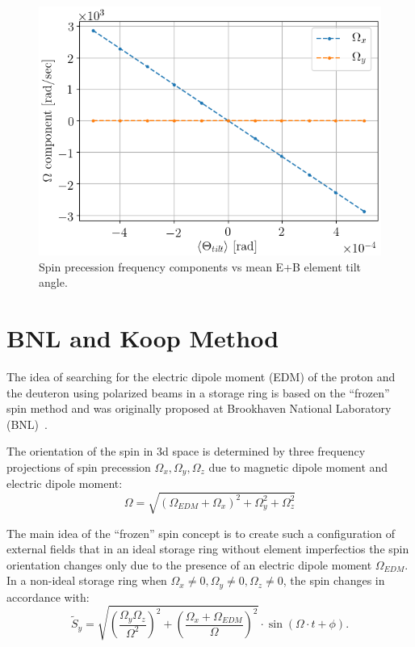 \documentclass[a4paper]{jpconf}
\newcommand{\W}{\Omega}
\begin{document}
\begin{figure}[h]\centering
	\includegraphics[width=.55\linewidth]{Figures/linearity_test_shifting_gauss_freq}\hspace{3mm}%
	\begin{minipage}{.35\linewidth}\caption{Spin precession frequency components vs mean E+B element tilt angle.\label{fig:MDM_vs_tilt}}
	\end{minipage}
\end{figure}

\section{BNL and Koop Method}
The idea of searching for the electric dipole moment (EDM) of the proton and the deuteron using polarized beams in a storage ring is based on the ``frozen'' spin method and was originally proposed at Brookhaven National Laboratory (BNL)~\cite{Farley}.

The orientation of the spin in 3d space is determined by three frequency projections of spin precession $\W_x, \W_y, \W_z$ due to magnetic dipole moment and electric dipole moment:
\begin{equation}\label{eq:Omega}
\W=\sqrt{\left(\W_{EDM}+\W_x\right)^2+\W_y^2+\W_z^2}	
\end{equation}

The main idea of the ``frozen'' spin concept is to create such a configuration of external fields that in an ideal storage ring without element imperfectios the spin orientation changes only due to the presence of an electric dipole moment $\W_{EDM}$. 
In a non-ideal storage ring when $\W_x\neq0, \W_y\neq0, \W_z\neq0$, the spin changes in accordance with:
\begin{equation}\label{eq:Sy-oscillation}
	\tilde{S}_y = \sqrt{\left(\frac{\W_y\W_z}{\W^2}\right)^2 + \left(\frac{\W_x + \W_{EDM}}{\W}\right)^2}\cdot \sin(\W\cdot t + \phi).
\end{equation}
\end{document}
